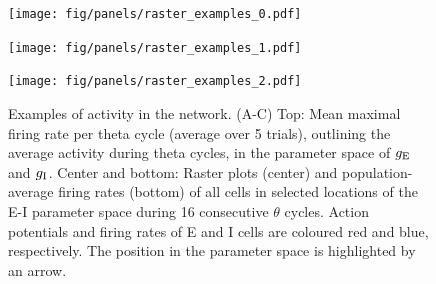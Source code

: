 \documentclass[a4paper,12pt]{article}
\newcommand{\ssc}[3]{\ensuremath{#1_{\text{#2}_{\text{#3}}}}}
\newcommand{\gE      }{\ssc{g}      {\scriptsize{E}}{}}
\newcommand{\gI      }{\ssc{g}      {\scriptsize{I}}{}}
\begin{document}
\clearpage

%

\begin{figure}[p]
    \centering
        \texttt{[image: fig/panels/raster\_examples\_0.pdf]}
\end{figure}

\begin{figure}[p]
    \centering
        \texttt{[image: fig/panels/raster\_examples\_1.pdf]}
\end{figure}

\begin{figure}[p]
    \centering
        \texttt{[image: fig/panels/raster\_examples\_2.pdf]}
\end{figure}

\clearpage

\setcounter{figure}{0}
\renewcommand{\figurename}{Figure 5 - figure supplement}

\begin{figure}[H]
    \internallinenumbers
    \caption{Examples of activity in the network. (A-C) Top: Mean maximal
    firing rate per theta cycle (average over 5 trials), outlining the average
    activity during theta cycles, in the parameter space of $\gE$ and $\gI$.
    Center and bottom: Raster plots (center) and population-average firing
    rates (bottom) of all cells in selected locations of the E-I parameter
    space during 16 consecutive $\theta$ cycles. Action potentials and firing
    rates of E and I cells are coloured red and blue, respectively. The position
    in the parameter space is highlighted by an arrow.}
\end{figure}
\end{document}
